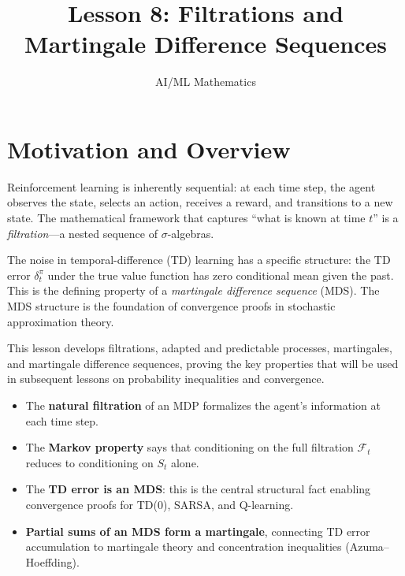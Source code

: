 \documentclass[11pt,a4paper]{article}
\title{Lesson 8: Filtrations and Martingale Difference Sequences}
\author{AI/ML Mathematics}
\date{}
\begin{document}
\maketitle
\tableofcontents
\newpage


\section{Motivation and Overview}
\label{sec:motivation}

Reinforcement learning is inherently sequential: at each time
step, the agent observes the state, selects an action, receives a
reward, and transitions to a new state.  The mathematical
framework that captures ``what is known at time $t$'' is a
\emph{filtration}---a nested sequence of $\sigma$-algebras.

The noise in temporal-difference (TD) learning has a specific
structure: the TD error $\delta_t^\pi$ under the true value
function has zero conditional mean given the past.  This is the
defining property of a \emph{martingale difference sequence}
(MDS).  The MDS structure is the foundation of convergence
proofs in stochastic approximation theory.

This lesson develops filtrations, adapted and predictable
processes, martingales, and martingale difference sequences,
proving the key properties that will be used in subsequent
lessons on probability inequalities and convergence.

\begin{rlconnection}[title={Why This Matters for RL}]
\begin{itemize}[nosep]
  \item The \textbf{natural filtration} of an MDP formalizes the
    agent's information at each time step.
  \item The \textbf{Markov property} says that conditioning on
    the full filtration $\mathcal{F}_t$ reduces to conditioning
    on $S_t$ alone.
  \item The \textbf{TD error is an MDS}: this is the central
    structural fact enabling convergence proofs for TD(0), SARSA,
    and Q-learning.
  \item \textbf{Partial sums of an MDS form a martingale},
    connecting TD error accumulation to martingale theory and
    concentration inequalities (Azuma--Hoeffding).
\end{itemize}
\end{rlconnection}
\end{document}
